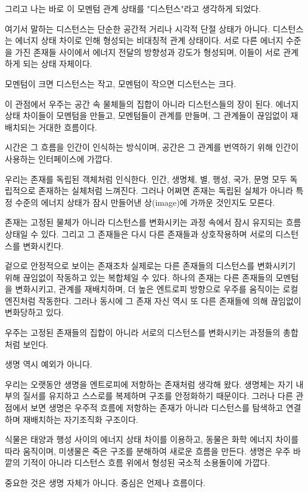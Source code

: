 \documentclass[12pt]{article}
\begin{document}
그리고 나는 바로 이 모멘텀 관계 상태를 "디스턴스"라고 생각하게 되었다.

여기서 말하는 디스턴스는 단순한 공간적 거리나 시각적 단절 상태가 아니다. 디스턴스는 에너지 상태 차이로 인해 형성되는 비대칭적 관계 상태이다. 서로 다른 에너지 수준을 가진 존재들 사이에서 에너지 전달의 방향성과 강도가 형성되며, 이들이 서로 관계하게 되는 상태 자체이다.

모멘텀이 크면 디스턴스는 작고, 모멘텀이 작으면 디스턴스는 크다.

이 관점에서 우주는 공간 속 물체들의 집합이 아니라 디스턴스들의 장이 된다. 에너지 상태 차이들이 모멘텀을 만들고, 모멘텀들이 관계를 만들며, 그 관계들이 끊임없이 재배치되는 거대한 흐름이다.

시간은 그 흐름을 인간이 인식하는 방식이며, 공간은 그 관계를 번역하기 위해 인간이 사용하는 인터페이스에 가깝다.

우리는 존재를 독립된 객체처럼 인식한다. 인간, 생명체, 별, 행성, 국가, 문명 모두 독립적으로 존재하는 실체처럼 느껴진다. 그러나 어쩌면 존재는 독립된 실체가 아니라 특정 수준의 에너지 상태가 잠시 만들어낸 상(image)에 가까운 것인지도 모른다.

존재는 고정된 물체가 아니라 디스턴스를 변화시키는 과정 속에서 잠시 유지되는 흐름 상태일 수 있다. 그리고 그 존재들은 다시 다른 존재들과 상호작용하며 서로의 디스턴스를 변화시킨다.

겉으로 안정적으로 보이는 존재조차 실제로는 다른 존재들의 디스턴스를 변화시키기 위해 끊임없이 작동하고 있는 복합체일 수 있다. 하나의 존재는 다른 존재들의 모멘텀을 변화시키고, 관계를 재배치하며, 더 높은 엔트로피 방향으로 우주를 움직이는 로컬 엔진처럼 작동한다. 그러나 동시에 그 존재 자신 역시 또 다른 존재들에 의해 끊임없이 변화당하고 있다.

우주는 고정된 존재들의 집합이 아니라 서로의 디스턴스를 변화시키는 과정들의 총합처럼 보인다.

생명 역시 예외가 아니다.

우리는 오랫동안 생명을 엔트로피에 저항하는 존재처럼 생각해 왔다. 생명체는 자기 내부의 질서를 유지하고 스스로를 복제하며 구조를 안정화하기 때문이다. 그러나 다른 관점에서 보면 생명은 우주적 흐름에 저항하는 존재가 아니라 디스턴스를 탐색하고 연결하며 재배치하는 자기조직화 구조이다.

식물은 태양과 행성 사이의 에너지 상태 차이를 이용하고, 동물은 화학 에너지 차이를 따라 움직이며, 미생물은 죽은 구조를 분해하여 새로운 흐름을 만든다. 생명은 우주 바깥의 기적이 아니라 디스턴스 흐름 위에서 형성된 국소적 소용돌이에 가깝다.

중요한 것은 생명 자체가 아니다. 중심은 언제나 흐름이다.
\end{document}
